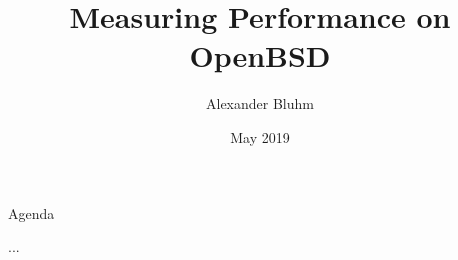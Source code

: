 \documentclass[14pt,aspectratio=169]{beamer}
\author{Alexander Bluhm}
\title{Measuring Performance on OpenBSD}
\institute{bluhm@openbsd.org}
\date{May 2019}
\begin{document}
\begin{frame}
\titlepage
\end{frame}

\begin{frame}{Agenda}
\setcounter{tocdepth}{1}
\tableofcontents
\end{frame}

...
\end{document}
